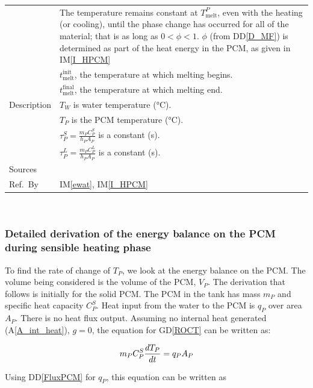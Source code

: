 \documentclass[12pt]{article}
\newcommand{\colAwidth}{0.13\textwidth}
\newcommand{\colBwidth}{0.82\textwidth}
\newcommand{\dref}[1]{GD\ref{#1}}
\newcommand{\ddref}[1]{DD\ref{#1}}
\newcommand{\aref}[1]{A\ref{#1}}
\newcommand{\iref}[1]{IM\ref{#1}}
\begin{document}
\begin{minipage}{\textwidth}
\begin{tabular}{| p{\colAwidth} | p{\colBwidth}|}
  &The temperature remains constant at $T_\text{melt}^P$, even with the heating 
  (or cooling), until the phase change has occurred for all of the material; that 
  is as long as $0 < \phi<1$.  $\phi$ (from \ddref{D_MF}) is determined as part
  of the heat energy in the PCM, as given in \iref{I_HPCM}\\
  & $t_\text{melt}^\text{init}$, the temperature at which melting begins.\\
  & $t_\text{melt}^\text{final}$, the temperature at which melting end.\\

  \hline
  Description&$T_W$ is water temperature (\si{\celsius}).\\
  &$T_P$ is the PCM temperature (\si{\celsius}).\\
  &$\tau^S_P = \frac{m_P C^S_P}{h_P A_P}$ is a constant
  (\si{\second}).\\
  &$\tau^L_P = \frac{m_P C^L_P}{h_P A_P}$ is a constant
  (\si{\second}).
  \\
  \hline
  Sources&~\cite{Lightstone2012}\ \\
  \hline
  Ref.\ By & \iref{ewat}, \iref{I_HPCM}\\
  \hline
\end{tabular}
\end{minipage}\\

\subsubsection*{Detailed derivation of the energy balance on the PCM during sensible heating phase}

To find the rate of change of $T_P$, we look at the energy balance on the PCM.
The volume being considered is the volume of the PCM, $V_P$.  The derivation that
follows is initially for the solid PCM.  The PCM in the tank has mass $m_P$ and
specific heat capacity $C^S_P$.  Heat input from the water to the PCM is $q_P$
over area $A_P$.  There is no heat flux output.  Assuming no internal heat
generated (\aref{A_int_heat}), $g=0$, the equation for \dref{ROCT} can be
written as:

\begin{equation*}
\\m_P C_P^S \frac{d T_P}{dt} = q_P A_P
\end{equation*}

\noindent
Using \ddref{FluxPCM} for $q_P$, this equation can be written as
\end{document}
